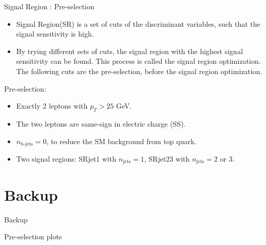 \documentclass[mathserif,serif]{beamer}
\begin{document}
\begin{frame}{Signal Region : Pre-selection}
\begin{itemize}
\item Signal Region(SR) is a set of cuts of the discriminant variables, such that the signal sensitivity is high.
\item By trying different sets of cuts, the signal region with the highest signal sensitivity can be found. This process is called the signal region optimization.
The following cuts are the pre-selection, before the signal region optimization.
\end{itemize}
Pre-selection:
\begin{itemize}
\item Exactly 2 leptons with $p_T > 25$ GeV.
\item The two leptons are same-sign in electric charge (SS).
\item $n_{\text{b-jets}} = 0$, to reduce the SM background from top quark.
\item Two signal regions: SRjet1 with $n_{\text{jets}} = 1$, SRjet23 with $n_{\text{jets}} = 2$ or $3$.
\end{itemize}
\end{frame}


\section{Backup}
\begin{frame}
\begin{center}
\huge
Backup
\end{center}
\end{frame}

\begin{frame}
\begin{center}
\huge
Pre-selection plots
\end{center}
\end{frame}
\end{document}

